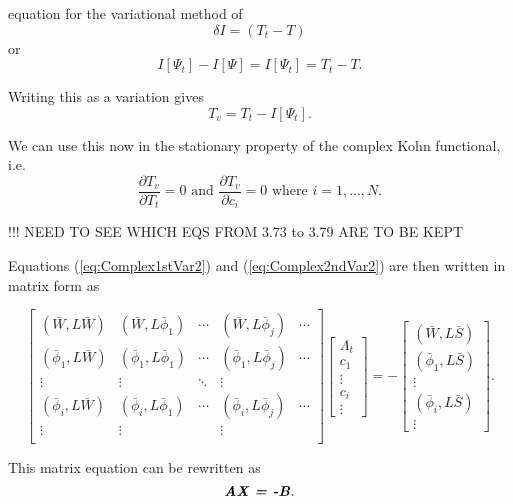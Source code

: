 \documentclass[preprint,showpacs,preprintnumbers,amsmath,amssymb]{revtex4}
\newcommand{\beq}{\begin{equation}}
\newcommand{\eeq}{\end{equation}}
\begin{document}
equation for the variational method of
\beq
\delta I = (T_t - T)
\eeq
or
\beq
I[\Psi_t] - I[\Psi] = I[\Psi_t] = T_t - T.
\eeq

\noindent Writing this as a variation gives
\beq
T_v = T_t - I[\Psi_t].
\label{eq:ComplexKohnVariation}
\eeq





We can use this now in the stationary property of the complex Kohn functional, i.e.
\beq
\frac{\partial T_v}{\partial T_t} = 0  \text{ and } \frac{\partial T_v}{\partial c_i} = 0 \text{ where $i = 1,\ldots,N$}.
\label{eq:ComplexKohnStationary}
\eeq

!!! NEED TO SEE WHICH EQS FROM 3.73 to 3.79 ARE TO BE KEPT


Equations (\ref{eq:Complex1stVar2}) and (\ref{eq:Complex2ndVar2}) are then written in matrix form as

\begin{equation}
\label{eq:ComplexKohnMatrix}
\begin{bmatrix} 
 (\bar{W},L\bar{W}) & (\bar{W},L\bar{\phi}_1) & \cdots & (\bar{W},L\bar{\phi}_j) & \cdots\\
 (\bar{\phi}_1,L\bar{W}) & (\bar{\phi}_1,L\bar{\phi}_1) & \cdots & (\bar{\phi}_1,L\bar{\phi}_j) & \cdots\\
 \vdots & \vdots & \ddots & \vdots \\
 (\bar{\phi}_i,L\bar{W}) & (\bar{\phi}_i,L\bar{\phi}_1) & \cdots & (\bar{\phi}_i,L\bar{\phi}_j) & \cdots\\
 \vdots & \vdots & & \vdots & \\
\end{bmatrix}
\begin{bmatrix}
\Lambda_t\\
c_1\\
\vdots\\
c_i\\
\vdots
\end{bmatrix}
= -
\begin{bmatrix}
(\bar{W},L\bar{S}) \\
(\bar{\phi}_1,L\bar{S}) \\
\vdots \\
(\bar{\phi}_i,L\bar{S}) \\
\vdots
\end{bmatrix}.
\end{equation}

\noindent This matrix equation can be rewritten as
\beq
\textbf{\emph{AX = -B}}.
\eeq
\end{document}
